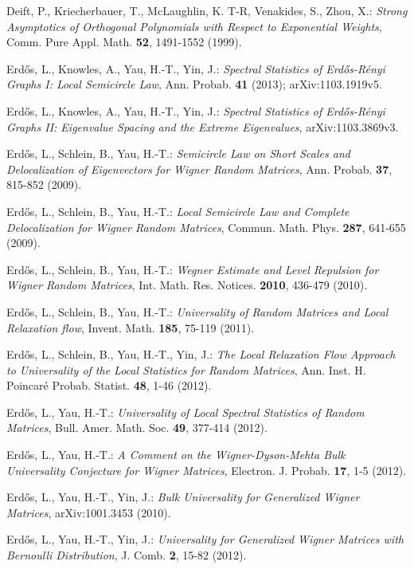 \documentclass[reqno, 10pt]{amsart}
\theoremstyle{definition}
\theoremstyle{remark}
\numberwithin{equation}{section}
\numberwithin{thm}{section}
\begin{document}
\begin{thebibliography}{}
 Deift, P., Kriecherbauer, T., McLaughlin, K. T-R, Venakides, S., Zhou, X.: \emph{Strong Asymptotics of Orthogonal Polynomials with Respect to Exponential Weights}, Comm. Pure Appl. Math. \textbf{52}, 1491-1552 (1999).

 Erd\H{o}s, L., Knowles, A., Yau, H.-T., Yin, J.: \emph{Spectral Statistics of Erd\H{o}s-R\'enyi Graphs I: Local Semicircle Law}, Ann. Probab. \textbf{41} (2013); arXiv:1103.1919v5.

 Erd\H{o}s, L., Knowles, A., Yau, H.-T., Yin, J.: \emph{Spectral Statistics of Erd\H{o}s-R\'enyi Graphs II: Eigenvalue Spacing and the Extreme Eigenvalues}, arXiv:1103.3869v3.

 Erd\H{o}s, L., Schlein, B., Yau, H.-T.: \emph{Semicircle Law on Short Scales and Delocalization of Eigenvectors for Wigner Random Matrices}, Ann. Probab. \textbf{37}, 815-852 (2009).

 Erd\H{o}s, L., Schlein, B., Yau, H.-T.: \emph{Local Semicircle Law and Complete Delocalization for Wigner Random Matrices}, Commun. Math. Phys. \textbf{287}, 641-655 (2009).

 Erd\H{o}s, L., Schlein, B., Yau, H.-T.: \emph{Wegner Estimate and Level Repulsion for Wigner Random Matrices}, Int. Math. Res. Notices. \textbf{2010}, 436-479 (2010).

 Erd\H{o}s, L., Schlein, B., Yau, H.-T.: \emph{Universality of Random Matrices and Local Relaxation flow}, Invent. Math. \textbf{185}, 75-119 (2011).

 Erd\H{o}s, L., Schlein, B., Yau, H.-T., Yin, J.: \emph{The Local Relaxation Flow Approach to Universality of the Local Statistics for Random Matrices}, Ann. Inst. H. Poincar\'e Probab. Statist. \textbf{48}, 1-46 (2012).

 Erd\H{o}s, L., Yau, H.-T.: \emph{Universality of Local Spectral Statistics of Random Matrices}, Bull. Amer. Math. Soc. \textbf{49}, 377-414 (2012).

 Erd\H{o}s, L., Yau, H.-T.: \emph{A Comment on the Wigner-Dyson-Mehta Bulk Universality Conjecture for Wigner Matrices}, Electron. J. Probab. \textbf{17}, 1-5 (2012).

 Erd\H{o}s, L., Yau, H.-T., Yin, J.: \emph{Bulk Universality for Generalized Wigner Matrices}, arXiv:1001.3453 (2010).

 Erd\H{o}s, L., Yau, H.-T., Yin, J.: \emph{Universality for Generalized Wigner Matrices with Bernoulli Distribution}, J. Comb. \textbf{2}, 15-82 (2012).


\end{thebibliography}
\end{document}
